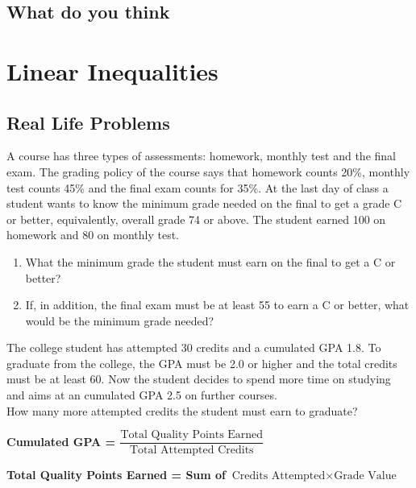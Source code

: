 \documentclass[en,11pt]{latex/elegantbookr}
\providecommand{\tightlist}{%
  \setlength{\itemsep}{0pt}\setlength{\parskip}{0pt}}
\theoremstyle{definition}
\theoremstyle{definition}
\theoremstyle{definition}
\theoremstyle{remark}
\let\BeginKnitrBlock\begin \let\EndKnitrBlock\end
\begin{document}
\hypertarget{what-do-you-think}{%
\section{What do you think}\label{what-do-you-think}}

\hypertarget{linear-inequalities}{%
\chapter{Linear Inequalities}\label{linear-inequalities}}

\hypertarget{real-life-problems}{%
\section{Real Life Problems}\label{real-life-problems}}

\BeginKnitrBlock{rmdthink}
A course has three types of assessments: homework, monthly test and the final exam. The grading policy of the course says that homework counts 20\%, monthly test counts 45\% and the final exam counts for 35\%. At the last day of class a student wants to know the minimum grade needed on the final to get a grade C or better, equivalently, overall grade 74 or above. The student earned 100 on homework and 80 on monthly test.

\begin{enumerate}
\def\labelenumi{\arabic{enumi}.}
\tightlist
\item
  What the minimum grade the student must earn on the final to get a C or better?
\item
  If, in addition, the final exam must be at least 55 to earn a C or better, what would be the minimum grade needed?
\end{enumerate}
\EndKnitrBlock{rmdthink}

\begin{rmdthink}
The college student has attempted 30 credits and a cumulated GPA 1.8. To
graduate from the college, the GPA must be 2.0 or higher and the total
credits must be at least 60. Now the student decides to spend more time
on studying and aims at an cumulated GPA 2.5 on further courses.\\
How many more attempted credits the student must earn to graduate?

\textbf{Cumulated GPA =
\(\dfrac{\text{Total Quality Points Earned}}{\text{Total Attempted Credits}}\)}

\textbf{Total Quality Points Earned = Sum of
\(\text{Credits Attempted}\times \text{Grade Value}\)}
\end{rmdthink}
\end{document}
